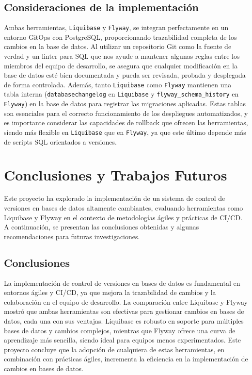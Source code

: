 \documentclass{IEEEtran}
\begin{document}
\subsection{Consideraciones de la implementación}
Ambas herramientas, \texttt{Liquibase} y \texttt{Flyway}, se integran perfectamente en un entorno GitOps con PostgreSQL, proporcionando trazabilidad completa de los cambios en la base de datos. Al utilizar un repositorio Git como la fuente de verdad y un linter para SQL que nos ayude a mantener algunas reglas entre los miembros del equipo de desarrollo, se asegura que cualquier modificación en la base de datos esté bien documentada y pueda ser revisada, probada y desplegada de forma controlada. Además, tanto \texttt{Liquibase} como \texttt{Flyway} mantienen una tabla interna (\texttt{databasechangelog} en \texttt{Liquibase} y \texttt{flyway\_schema\_history} en \texttt{Flyway}) en la base de datos para registrar las migraciones aplicadas. Estas tablas son esenciales para el correcto funcionamiento de los despliegues automatizados, y es importante considerar las capacidades de rollback que ofrecen las herramientas, siendo más flexible en \texttt{Liquibase} que en \texttt{Flyway}, ya que este último depende más de scripts SQL orientados a versiones.


\section{Conclusiones y Trabajos Futuros}
Este proyecto ha explorado la implementación de un sistema de control de versiones en bases de datos altamente cambiantes, evaluando herramientas como Liquibase y Flyway en el contexto de metodologías ágiles y prácticas de CI/CD. A continuación, se presentan las conclusiones obtenidas y algunas recomendaciones para futuras investigaciones.

\subsection{Conclusiones}
La implementación de control de versiones en bases de datos es fundamental en entornos ágiles y CI/CD, ya que mejora la trazabilidad de cambios y la colaboración en el equipo de desarrollo. La comparación entre Liquibase y Flyway mostró que ambas herramientas son efectivas para gestionar cambios en bases de datos, cada una con sus ventajas. Liquibase es robusto en soporte para múltiples bases de datos y cambios complejos, mientras que Flyway ofrece una curva de aprendizaje más sencilla, siendo ideal para equipos menos experimentados. Este proyecto concluye que la adopción de cualquiera de estas herramientas, en combinación con prácticas ágiles, incrementa la eficiencia en la implementación de cambios en bases de datos.
\end{document}
